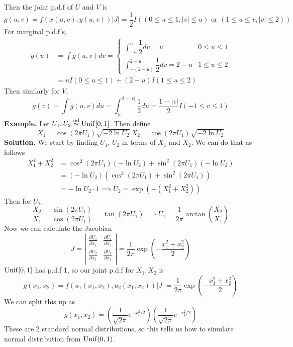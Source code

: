 \documentclass[openany]{report}
\begin{document}
    Then the joint p.d.f of $U$ and $V$ is 
    \[g(u,v) = f(x(u,v), y(u,v))|J| = \frac{1}{2}I((0 \leq u \leq 1, |v| \leq u) \text{ or } (1 \leq u \leq v, |v|\leq 2))\]
    For marginal p.d.f's, 
    \begin{align*}
        g(u) &= \int g(u,v)dv = \begin{cases}
            \displaystyle\int_{-u}^u \dfrac{1}{2} dv = u & 0 \leq u \leq 1\\
            \displaystyle\int_{-(2-u)}^{2-u}\dfrac{1}{2}dv = 2-u & 1 \leq u \leq 2 
        \end{cases}\\
        &= uI(0 \leq u \leq 1) + (2-u)I(1 \leq u \leq 2)
    \end{align*}
    Then similarly for $V$, 
    \[
        g(v) = \int g(u,v)du = \int_{|v|}^{2-|v|} \frac{1}{2}du = \frac{1-|v|}{2}I(-1 \leq v \leq 1)
    \]
    \textbf{Example.} Let $U_1,U_2 \overset{\mathrm{iid}}{\sim} \operatorname{Unif}[0,1]$. Then define 
    \[X_1 = \cos(2\pi U_1)\sqrt{-2\ln U_2} \ X_2 = \cos(2\pi U_1)\sqrt{-2\ln U_2}\]
    \textbf{Solution.} We start by finding $U_1$, $U_2$ in terms of $X_1$ and $X_2$. We can do that as follows 
    \begin{align*}
        X_1^2 + X_2^2 &= \cos^2(2\pi U_1) (-\ln U_2) + \sin^2(2\pi U_1)(-\ln U_2)\\
        &= (-\ln U_2)(\cos^2(2\pi U_1)  + \sin^2(2\pi U_1))\\
        &= -\ln U_2 \cdot 1 \implies U_2 = \exp(-(X_1^2 + X_2^2))
    \end{align*}
    Then for $U_1$, 
    \[\frac{X_2}{X_1} = \frac{\sin(2\pi U_1)}{\cos(2\pi U_1)} = \tan(2 \pi U_1) \implies U_1 = \frac{1}{2\pi}\arctan\left(\frac{X_2}{X_1}\right)\]
    Now we can calculate the Jacobian 
    \[J = \left|\begin{matrix}
        \frac{\partial U_1}{\partial x_1} &
        \frac{\partial U_1}{\partial x_2} \\  
        \frac{\partial U_2}{\partial x_1} &
        \frac{\partial U_2}{\partial x_2} \\ 
    \end{matrix}\right| = \frac{1}{2\pi}\exp\left(-\frac{x_1^2 + x_2^2}{2}\right)\]
    $\operatorname{Unif}[0,1]$ has p.d.f 1, so our joint p.d.f for $X_1,X_2$ is 
    \[g(x_1,x_2) = f(u_1(x_1,x_2), u_2(x_1,x_2))|J| = \frac{1}{2\pi}\exp\left(-\frac{x_1^2 + x_2^2}{2}\right)\]
    We can split this up as 
    \[g(x_1,x_2) = \left(\frac{1}{\sqrt{2\pi}}e^{-x_1^2/2}\right)\left(\frac{1}{\sqrt{2\pi}}e^{-x_2^2/2}\right)\]
    These are 2 standard normal distributions, so this tells us how to simulate normal distribution from $\operatorname{Unif}(0,1)$.
\end{document}
